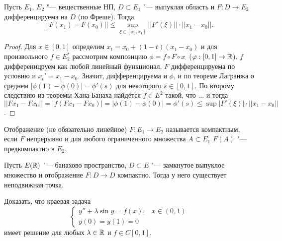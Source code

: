 \documentclass[main]{subfiles}
\begin{document}
\begin{theorem}
  Пусть \( E_1 \), \( E_2 \) "--- вещественные НП,
  \( D \subset E_1 \) "--- выпуклая область
  и \( F : D \to E_2 \) дифференцируема на \( D \)
  (по Фреше).
  Тогда
  \[
    ||F(x_1) - F(x_0)|| \le \sup_{\xi \in [x_0, x_1]} ||F'(\xi)|| \cdot ||x_1 - x_0||.
  \]
\end{theorem}
\begin{proof}
  Для \( x \in [0, 1] \) определим \( x_t = x_0 + (1 - t) (x_1 - x_0) \) и
  для произвольного \( f \in E_2^* \) рассмотрим композицию
  \( \phi = f \circ F \circ x_\cdot \)
  (\( \varphi : [0, 1] \to \mathbb{R} \)).
  \( f \) дифференицруем как любой линейный функционал,
  \( F \) дифференцируема по условию
  и \( x_t' = x_1 - x_0 \).
  Значит, дифференцируема и \( \phi \),
  и по теореме Лагранжа о среднем
  \( |\phi(1) - \phi(0)| = \phi'(s) \)
  для некоторого \( s \in [0, 1] \).
  По второму следствию из теоремы Хана-Банаха
  найдётся \( f \in E^2 \) такой, что ...
  и тогда
  \( ||F x_1 - F x_0|| = |f(Fx_1 - F x_0)| =
  |\phi(1) - \phi(0)| = \phi'(s) \le
  \sup |F'(\xi)| \cdot ||x_1 - x_0|| \).
\end{proof}

\begin{definition}
  Отображение (не обязательно линейное)
  \( F : E_1 \to E_2 \)
  называется компактным, если
  \( F \) непрерывно и для любого ограниченного
  множества \( A \subset E_1 \)
  \( F(A) \) "--- предкомпактно в \( E_2 \).
\end{definition}

\begin{theorem}[Шаудера]
  Пусть \( E(\mathbb{R}) \) "--- банахово пространство,
  \( D \subset E \) "--- замкнутое выпуклое множество
  и отображение \( F : D \to D \) компактно.
  Тогда у него существует неподвижная точка.
\end{theorem}

\begin{example}
  Доказать, что краевая задача
  \[
    \begin{cases}
      y'' + \lambda \sin y = f(x), & x \in (0, 1) \\
      y(0) = y(1) = 0
    \end{cases}
  \]
  имеет решение для любых \( \lambda \in \mathbb{R} \)
  и \( f \in C[0, 1] \).
\end{example}
\end{document}
